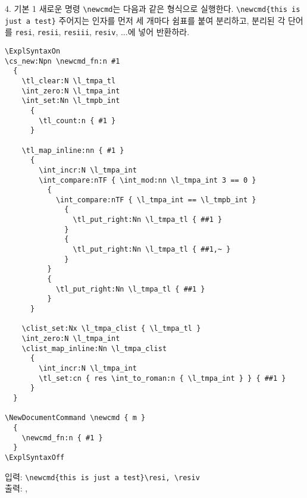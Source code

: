 \documentclass[a4paper,amsmath,itemph]{oblivoir}
\begin{document}
\begin{questionp}{4. 기본 1}
  새로운 명령 \verb|\newcmd|는 다음과 같은 형식으로 실행한다.
  \verb|\newcmd{this is just a test}|
  주어지는 인자를 먼저 세 개마다 쉼표를 붙여 분리하고, 분리된 각 단어를
  \verb|resi|, \verb|resii|, \verb|resiii|, \verb|resiv|, $\ldots$에 넣어
  반환하라.

  \tcblower

  \begin{verbatim}
\ExplSyntaxOn
\cs_new:Npn \newcmd_fn:n #1
  {
    \tl_clear:N \l_tmpa_tl
    \int_zero:N \l_tmpa_int
    \int_set:Nn \l_tmpb_int
      {
        \tl_count:n { #1 }
      }

    \tl_map_inline:nn { #1 }
      {
        \int_incr:N \l_tmpa_int
        \int_compare:nTF { \int_mod:nn \l_tmpa_int 3 == 0 }
          {
            \int_compare:nTF { \l_tmpa_int == \l_tmpb_int }
              {
                \tl_put_right:Nn \l_tmpa_tl { ##1 }
              }
              {
                \tl_put_right:Nn \l_tmpa_tl { ##1,~ }
              }
          }
          {
            \tl_put_right:Nn \l_tmpa_tl { ##1 }
          }
      }

    \clist_set:Nx \l_tmpa_clist { \l_tmpa_tl }
    \int_zero:N \l_tmpa_int
    \clist_map_inline:Nn \l_tmpa_clist
      {
        \int_incr:N \l_tmpa_int
        \tl_set:cn { res \int_to_roman:n { \l_tmpa_int } } { ##1 }
      }
  }

\NewDocumentCommand \newcmd { m }
  {
    \newcmd_fn:n { #1 }
  }
\ExplSyntaxOff
  \end{verbatim}
  \begin{tcolorbox}{}
    입력: \verb|\newcmd{this is just a test}\resi, \resiv|\\
    출력: \resi, \resiv
  \end{tcolorbox}
\end{questionp}
\end{document}
